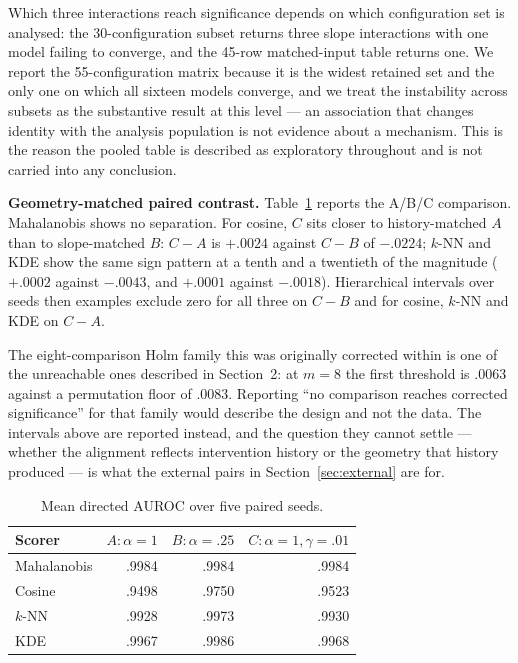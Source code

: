 \documentclass[11pt,a4paper]{article}
\begin{document}
Which three interactions reach significance depends on which configuration set is analysed: the 30-configuration subset returns three slope interactions with one model failing to converge, and the 45-row matched-input table returns one. We report the 55-configuration matrix because it is the widest retained set and the only one on which all sixteen models converge, and we treat the instability across subsets as the substantive result at this level --- an association that changes identity with the analysis population is not evidence about a mechanism. This is the reason the pooled table is described as exploratory throughout and is not carried into any conclusion.

\textbf{Geometry-matched paired contrast.} Table~\ref{tab:rq3} reports the A/B/C comparison. Mahalanobis shows no separation. For cosine, $C$ sits closer to history-matched $A$ than to slope-matched $B$: $C-A$ is $+.0024$ against $C-B$ of $-.0224$; $k$-NN and KDE show the same sign pattern at a tenth and a twentieth of the magnitude ($+.0002$ against $-.0043$, and $+.0001$ against $-.0018$). Hierarchical intervals over seeds then examples exclude zero for all three on $C-B$ and for cosine, $k$-NN and KDE on $C-A$.

The eight-comparison Holm family this was originally corrected within is one of the unreachable ones described in Section~2: at $m=8$ the first threshold is $.0063$ against a permutation floor of $.0083$. Reporting ``no comparison reaches corrected significance'' for that family would describe the design and not the data. The intervals above are reported instead, and the question they cannot settle --- whether the alignment reflects intervention history or the geometry that history produced --- is what the external pairs in Section~\ref{sec:external} are for.

\begin{table}[t]
\centering
\caption{Mean directed AUROC over five paired seeds.}
\label{tab:rq3}
\small
\begin{tabular}{lrrr}
\toprule
Scorer & $A:\alpha=1$ & $B:\alpha=.25$ & $C:\alpha=1,\gamma=.01$\\
\midrule
Mahalanobis & .9984 & .9984 & .9984\\
Cosine & .9498 & .9750 & .9523\\
$k$-NN & .9928 & .9973 & .9930\\
KDE & .9967 & .9986 & .9968\\
\bottomrule
\end{tabular}
\end{table}
\end{document}
